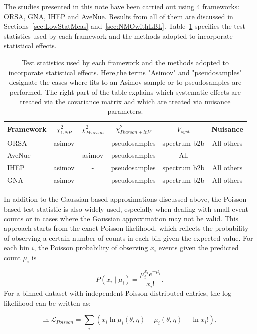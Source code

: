 The studies presented in this note have been carried out using 4 frameworks: ORSA, GNA, IHEP and AveNue. Results from all of them are discussed in Sections~\ref{sec:LowStatMeas} and~\ref{sec:NMOwithLBL}. 
Table~\ref{tab:Framewk_options} specifies the test statistics used by each framework and the methods adopted to incorporate statistical effects.

\begin{table}[h]
\centering
\begin{tabular}{lccc|cc}
\toprule
Framework & $\chi^2_{CNP}$ & $\chi^2_{Pearson}$ & $\chi^2_{Pearson+lnV}$ & $V_{syst}$ & Nuisance \\
\midrule
ORSA      & asimov  & -      & pseudosamples & spectrum b2b  & All others \\
AveNue    & -       & asimov & pseudosamples &    All        &  \\
IHEP      & asimov  & -      & pseudosamples & spectrum b2b   & All others\\
GNA       & asimov  & -      & pseudosamples &  spectrum b2b   & All others \\
\bottomrule
\end{tabular}
\caption{Test statistics used by each framework and the methods adopted to incorporate statistical effects. Here,the terms "Asimov" and "pseudosamples" designate the cases where fits to an Asimov sample or to pseudosamples are performed. The right part of the table explains which systematic effects are treated via the covariance matrix and which are treated via nuisance parameters.}
\label{tab:Framewk_options}
\end{table}

In addition to the Gaussian-based approximations discussed above, the Poisson-based test statistic is also widely used, especially when dealing with small event counts or in cases where the Gaussian approximation may not be valid. This approach starts from the exact Poisson likelihood, which reflects the probability of observing a certain number of counts in each bin given the expected value.
For each bin $i$, the Poisson probability of observing $x_i$ events given the predicted count $\mu_i$ is

$$P(x_i \mid \mu_i) = \frac{\mu_i^{x_i} e^{-\mu_i}}{x_i!}.$$
For a binned dataset with independent Poisson-distributed entries, the log-likelihood can be written as:

\begin{equation}  
\label{eq:poisson_like}  
\ln \mathcal{L}_{Poisson} = \sum_{i} \left( x_i \ln \mu_i(\theta, \eta) - \mu_i(\theta, \eta) - \ln x_i! \right),  
\end{equation}

